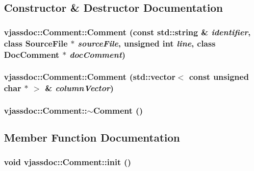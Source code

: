 \subsection{Constructor \& Destructor Documentation}
\hypertarget{classvjassdoc_1_1Comment_5f0e466f9d476c67442ada31ea51840e}{
\subsubsection{\setlength{\rightskip}{0pt plus 5cm}vjassdoc::Comment::Comment (const std::string \& {\em identifier}, class {\bf SourceFile} $\ast$ {\em sourceFile}, unsigned int {\em line}, class {\bf DocComment} $\ast$ {\em docComment})}}
\label{classvjassdoc_1_1Comment_5f0e466f9d476c67442ada31ea51840e}


\hypertarget{classvjassdoc_1_1Comment_ba8561a5b6e39538356e21e7edf93432}{
\subsubsection{\setlength{\rightskip}{0pt plus 5cm}vjassdoc::Comment::Comment (std::vector$<$ const unsigned char $\ast$ $>$ \& {\em columnVector})}}
\label{classvjassdoc_1_1Comment_ba8561a5b6e39538356e21e7edf93432}


\hypertarget{classvjassdoc_1_1Comment_97211d4a9d951c8eed8061c5e7a518b8}{
\subsubsection{\setlength{\rightskip}{0pt plus 5cm}vjassdoc::Comment::$\sim$Comment ()}}
\label{classvjassdoc_1_1Comment_97211d4a9d951c8eed8061c5e7a518b8}




\subsection{Member Function Documentation}
\hypertarget{classvjassdoc_1_1Comment_07ad51bf42ce397832b77eb96379c054}{
\subsubsection{\setlength{\rightskip}{0pt plus 5cm}void vjassdoc::Comment::init ()}}
\label{classvjassdoc_1_1Comment_07ad51bf42ce397832b77eb96379c054}




